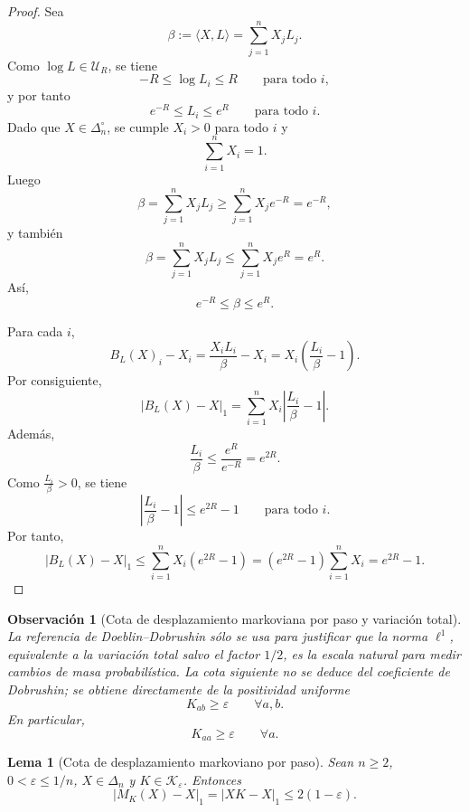 ﻿\documentclass[12pt]{article}
\newtheorem{lema}{Lema}[section]
\newtheorem{observacion}{Observación}[section]
\begin{document}
\begin{proof}
Sea
\[
\beta:=\langle X,L\rangle=\sum_{j=1}^n X_jL_j.
\]
Como \(\log L\in\mathcal U_R\), se tiene
\[
-R\le \log L_i\le R
\qquad\text{para todo }i,
\]
y por tanto
\[
e^{-R}\le L_i\le e^R
\qquad\text{para todo }i.
\]
Dado que \(X\in\Delta_n^\circ\), se cumple \(X_i>0\) para todo \(i\) y
\[
\sum_{i=1}^n X_i=1.
\]
Luego
\[
\beta
=
\sum_{j=1}^n X_jL_j
\ge
\sum_{j=1}^n X_j e^{-R}
=
e^{-R},
\]
y también
\[
\beta
=
\sum_{j=1}^n X_jL_j
\le
\sum_{j=1}^n X_j e^R
=
e^R.
\]
Así,
\[
e^{-R}\le \beta\le e^R.
\]

Para cada \(i\),
\[
B_L(X)_i-X_i
=
\frac{X_iL_i}{\beta}-X_i
=
X_i\left(\frac{L_i}{\beta}-1\right).
\]
Por consiguiente,
\[
\left|B_L(X)-X\right|_1
=
\sum_{i=1}^n
X_i\left|\frac{L_i}{\beta}-1\right|.
\]
Además,
\[
\frac{L_i}{\beta}
\le
\frac{e^R}{e^{-R}}
=
e^{2R}.
\]
Como \(\frac{L_i}{\beta}>0\), se tiene
\[
\left|\frac{L_i}{\beta}-1\right|
\le
e^{2R}-1
\qquad\text{para todo }i.
\]
Por tanto,
\[
\left|B_L(X)-X\right|_1
\le
\sum_{i=1}^n
X_i(e^{2R}-1)
=
(e^{2R}-1)\sum_{i=1}^n X_i
=
e^{2R}-1.
\]
\end{proof}

\begin{observacion}[Cota de desplazamiento markoviana por paso y variación total]
La referencia de Doeblin--Dobrushin \citep{GaubertQu2014} sólo se usa para justificar que la norma \(\ell^1\), equivalente a la variación total salvo el factor \(1/2\), es la escala natural para medir cambios de masa probabilística. La cota siguiente no se deduce del coeficiente de Dobrushin; se obtiene directamente de la positividad uniforme
\[
K_{ab}\ge\varepsilon
\qquad\forall a,b.
\]
En particular,
\[
K_{aa}\ge\varepsilon
\qquad\forall a.
\]
\end{observacion}

\begin{lema}[Cota de desplazamiento markoviano por paso]\label{lem:cota_desplazamiento_markoviano}
Sean \(n\ge2\), \(0<\varepsilon\le 1/n\), \(X\in\Delta_n\) y \(K\in\mathcal K_\varepsilon\). Entonces
\[
\left|M_K(X)-X\right|_1
=
\left|XK-X\right|_1
\le
2(1-\varepsilon).
\]
\end{lema}
\end{document}
